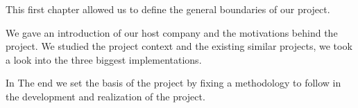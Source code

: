 \begin{spacing}{1.2}
This first chapter allowed us to define the general boundaries of our project.

We gave an introduction of our host company and the motivations behind the project.
We studied the project context and the existing similar projects, we took a look into the three biggest implementations.

In The end we set the basis of the project by fixing a methodology to follow in the development and realization of the project.





\end{spacing}
